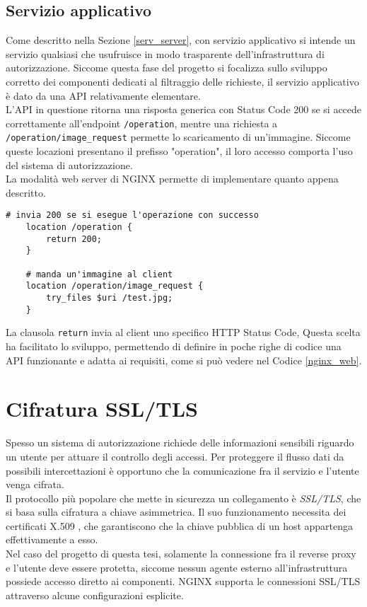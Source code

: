 \subsection{Servizio applicativo}
Come descritto nella Sezione \ref*{serv_server}, con servizio applicativo si intende un servizio qualsiasi che usufruisce in modo trasparente 
dell'infrastruttura di autorizzazione. 
Siccome questa fase del progetto si focalizza sullo sviluppo corretto dei componenti dedicati 
al filtraggio delle richieste, il servizio applicativo è dato da una API relativamente elementare. \\
L'API in questione ritorna una risposta generica con Status Code 200 se si accede correttamente all'endpoint \texttt{/operation}, 
mentre una richiesta a \texttt{/operation/image\_request} permette lo scaricamento di 
un'immagine. Siccome queste locazioni presentano il prefisso "operation", il loro accesso comporta l'uso 
del sistema di autorizzazione.  
\\La modalità web server di NGINX permette di implementare quanto appena descritto.
\lstset{language=nginx}
\begin{lstlisting}[caption={[Frammento di codice del servizio applicativo]Frammento di codice del servizio applicativo che mostra le funzionalità associate agli endpoint.},captionpos=b,label=nginx_web]
    # invia 200 se si esegue l'operazione con successo
    location /operation {
        return 200;
    }

    # manda un'immagine al client
    location /operation/image_request {
        try_files $uri /test.jpg;
    }
\end{lstlisting}
La clausola \texttt{return} invia al client uno specifico HTTP Status Code,  
Questa scelta ha facilitato lo sviluppo, permettendo di definire in poche righe di codice una API funzionante e adatta ai requisiti,  
come si può vedere nel Codice \ref*{nginx_web}.

\section{Cifratura SSL/TLS}
Spesso un sistema di autorizzazione richiede delle informazioni sensibili riguardo un utente per attuare il controllo 
degli accessi. 
Per proteggere il flusso dati da possibili intercettazioni è opportuno che la comunicazione fra il servizio e l'utente venga cifrata. 
\\ Il protocollo più popolare che mette in sicurezza un collegamento \newline è \textit{SSL/TLS}, che si basa sulla cifratura a chiave asimmetrica. Il suo funzionamento necessita 
dei certificati X.509 \cite{x509_rfc}, che garantiscono che la chiave pubblica di un host appartenga effettivamente a esso. 
\\ Nel caso del progetto di questa tesi, solamente la connessione fra il reverse proxy e l'utente deve essere protetta, siccome nessun agente esterno
 all'infrastruttura possiede accesso diretto ai componenti.
NGINX supporta le connessioni SSL/TLS attraverso alcune configurazioni esplicite.

